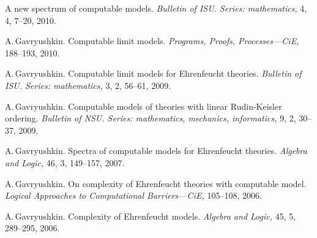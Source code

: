 \documentclass[12pt]{article}
\begin{document}
\begin{itemize}
{	A new spectrum of computable models.
	{\em Bulletin of ISU.
	Series: mathematics,} 4, 4, 7--20, 2010.
\item A.\,Gavryushkin.
	Computable limit models.
	{\em Programs, Proofs, Processes---CiE,} 188--193, 2010.
\item A.\,Gavryushkin.
	Computable limit models for Ehrenfeucht theories.
	{\em Bulletin of ISU.
	Series: mathematics,} 3, 2, 56--61, 2009.
\item A.\,Gavryushkin.
	Computable models of theories with linear Rudin-Keisler ordering.
	{\em Bulletin of NSU.
	Series: mathematics, mechanics, informatics,} 9, 2, 30--37, 2009.
\item A.\,Gavryushkin.
	Spectra of computable models for Ehrenfeucht theories.
	{\em Algebra and Logic,} 46, 3, 149--157, 2007.
\item A.\,Gavryushkin.
	On complexity of Ehrenfeucht theories with computable model.
	{\em Logical Approaches to Computational Barriers---CiE,} 105--108, 2006.
\item A.\,Gavryushkin.
	Complexity of Ehrenfeucht models.
	{\em Algebra and Logic,} 45, 5, 289--295, 2006.}
{}
\end{itemize}
\end{document}
